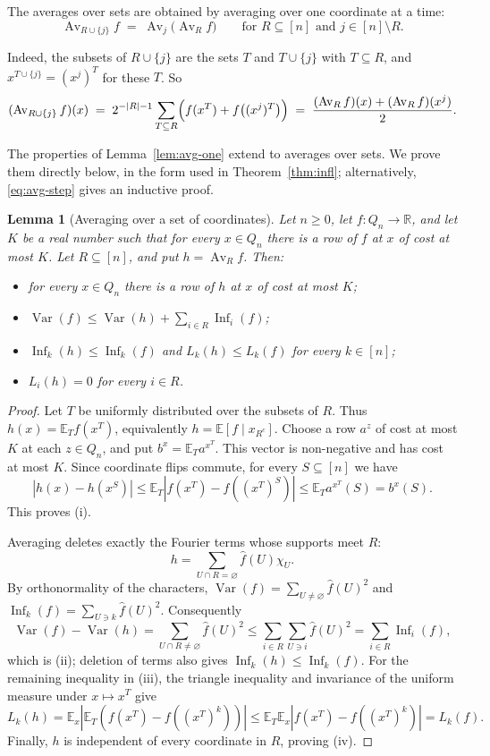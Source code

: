 \documentclass[11pt,reqno]{amsart}
\newtheorem{lemma}[theorem]{Lemma}
\theoremstyle{definition}
\theoremstyle{remark}
\numberwithin{equation}{section}
\theoremstyle{named}
\theoremstyle{plain}
\newcommand{\R}{\mathbb{R}}
\newcommand{\E}{\mathbb{E}}
\newcommand{\Var}{\operatorname{Var}}
\newcommand{\Inf}{\operatorname{Inf}}
\newcommand{\Av}{\operatorname{Av}}
\newcommand{\abs}[1]{\lvert #1\rvert}
\begin{document}
The averages over sets are obtained by averaging over one coordinate at
a time:
\begin{equation}\label{eq:avg-step}
   \Av_{R\cup\{j\}}f\;=\;\Av_j\bigl(\Av_Rf\bigr)\qquad\text{for }R\subseteq[n]\text{ and }j\in[n]\setminus R .
\end{equation}

Indeed, the subsets of $R\cup\{j\}$ are the sets $T$ and $T\cup\{j\}$ with $T\subseteq R$, and
$x^{T\cup\{j\}}=(x^{j})^{T}$ for these $T$. So
\[
   (\Av_{R\cup\{j\}}f)(x)\;=\;2^{-\abs{R}-1}\sum_{T\subseteq R}\Bigl(f(x^{T})+f\bigl((x^{j})^{T}\bigr)\Bigr)
   \;=\;\frac{(\Av_Rf)(x)+(\Av_Rf)(x^{j})}{2}.
\]

The properties of Lemma~\ref{lem:avg-one} extend to averages over sets. We prove them directly
below, in the form used in Theorem~\ref{thm:infl}; alternatively, \eqref{eq:avg-step} gives an
inductive proof.

\begin{lemma}[Averaging over a set of coordinates]\label{lem:avg-set}
Let $n\ge0$, let $f\colon Q_n\to\R$, and let $K$ be a real number such that for every $x\in Q_n$
there is a row of $f$ at $x$ of cost at most $K$. Let $R\subseteq[n]$, and put $h=\Av_Rf$. Then:
\begin{itemize}
\item[\textup{(i)}] for every $x\in Q_n$ there is a row of $h$ at $x$ of cost at most $K$;
\item[\textup{(ii)}] $\Var(f)\le\Var(h)+\sum_{i\in R}\Inf_i(f)$;
\item[\textup{(iii)}] $\Inf_k(h)\le\Inf_k(f)$ and $L_k(h)\le L_k(f)$ for every $k\in[n]$;
\item[\textup{(iv)}] $L_i(h)=0$ for every $i\in R$.
\end{itemize}
\end{lemma}

\begin{proof}
Let $T$ be uniformly distributed over the subsets of $R$. Thus
$h(x)=\E_T f(x^T)$, equivalently $h=\E[f\mid x_{R^c}]$.
Choose a row $a^z$ of cost at most $K$ at each $z\in Q_n$, and put $b^x=\E_Ta^{x^T}$.
This vector is non-negative and has cost at most $K$. Since coordinate flips commute,
for every $S\subseteq[n]$ we have
\[
   |h(x)-h(x^S)|
   \le\E_T|f(x^T)-f((x^T)^S)|
   \le\E_Ta^{x^T}(S)=b^x(S).
\]
This proves (i).

Averaging deletes exactly the Fourier terms whose supports meet $R$:
\[
   h=\sum_{U\cap R=\varnothing}\hat f(U)\chi_U.
\]
By orthonormality of the characters,
$\Var(f)=\sum_{U\ne\varnothing}\hat f(U)^2$ and
$\Inf_k(f)=\sum_{U\ni k}\hat f(U)^2$. Consequently
\[
   \Var(f)-\Var(h)
   =\sum_{U\cap R\ne\varnothing}\hat f(U)^2
   \le\sum_{i\in R}\sum_{U\ni i}\hat f(U)^2
   =\sum_{i\in R}\Inf_i(f),
\]
which is (ii); deletion of terms also gives $\Inf_k(h)\le\Inf_k(f)$.
For the remaining inequality in (iii), the triangle inequality and invariance of the uniform
measure under $x\mapsto x^T$ give
\[
   L_k(h)=\E_x|\E_T(f(x^T)-f((x^T)^k))|
   \le\E_T\E_x|f(x^T)-f((x^T)^k)|=L_k(f).
\]
Finally, $h$ is independent of every coordinate in $R$, proving (iv).
\end{proof}
\end{document}
